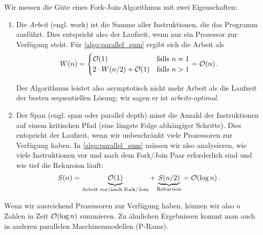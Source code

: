 Wir messen die Güte eines Fork-Join-Algorithmus mit zwei Eigenschaften:
\begin{enumerate}
    \item
          Die  \emph{Arbeit} (engl. work) ist die Summe aller Instruktionen, die das Programm ausführt.
          Dies entspricht also der Laufzeit, wenn nur ein Prozessor zur Verfügung steht.
          Für \cref{algo:parallel_sum} ergibt sich die Arbeit als
          \begin{equation}
              W(n) = \begin{cases}
                  \mathcal{O}\!\left(1\right)                  & \text{falls } n = 1 \\
                  2 \cdot W(n/2) + \mathcal{O}\!\left(1\right) & \text{falls } n > 1
              \end{cases}
              = \mathcal{O}\!\left(n\right).
          \end{equation}

          Der  Algorithmus leistet also asymptotisch nicht mehr Arbeit als die Laufzeit der besten sequentiellen Lösung; wir sagen er ist \emph{arbeits-optimal}.

    \item
          Der  Span (engl. span oder parallel depth) misst die Anzahl der Instruktionen auf einem kritischen Pfad (\dh eine längste Folge abhängiger Schritte).
          Dies entspricht der Laufzeit, wenn wir unbeschränkt viele Prozessoren zur Verfügung haben.
          In \cref{algo:parallel_sum} müssen wir also analysieren, wie viele Instruktionen vor und nach dem Fork/Join Paar erforderlich sind und wie tief die Rekursion läuft:
          \begin{equation}
              S(n) = \underbrace{\mathcal{O}\!\left(1\right)}_\text{Arbeit vor/nach Fork/Join} + \underbrace{S(n/2)}_\text{Rekursion} = \mathcal{O}\!\left(\log n\right).
          \end{equation}
\end{enumerate}

Wenn wir ausreichend Prozessoren zur Verfügung haben, können wir also $n$ Zahlen in Zeit $\mathcal{O}\!\left(\log n\right)$ summieren.
Zu ähnlichen Ergebnissen kommt man auch in anderen parallelen Maschinenmodellen (\zB P-Rams).

